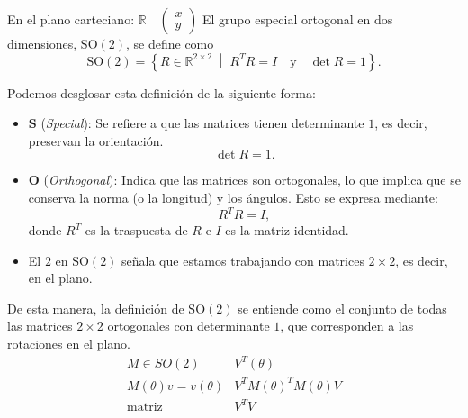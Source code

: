 \documentclass[a4paper,12pt]{article}
\begin{document}
En el plano carteciano: 
$\mathbb{R} \quad \begin{pmatrix}
    x\\y
\end{pmatrix} $
El grupo especial ortogonal en dos dimensiones, \(\mathrm{SO}(2)\), se define como
\[
\mathrm{SO}(2) = \left\{ R \in \mathbb{R}^{2\times2} \;\middle|\; R^T R = I \quad \text{y} \quad \det R = 1 \right\}.
\]
\vspace{1cm}

Podemos desglosar esta definición de la siguiente forma:

\begin{itemize}
  \item \(\mathbf{S}\) (\emph{Special}): Se refiere a que las matrices tienen determinante \(1\), es decir, preservan la orientación.  
    \[
    \det R = 1.
    \]
  \item \(\mathbf{O}\) (\emph{Orthogonal}): Indica que las matrices son ortogonales, lo que implica que se conserva la norma (o la longitud) y los ángulos. Esto se expresa mediante:
    \[
    R^T R = I,
    \]
    donde \(R^T\) es la traspuesta de \(R\) e \(I\) es la matriz identidad.
  \item El \(2\) en \(\mathrm{SO}(2)\) señala que estamos trabajando con matrices \(2 \times 2\), es decir, en el plano.
\end{itemize}

De esta manera, la definición de \(\mathrm{SO}(2)\) se entiende como el conjunto de todas las matrices \(2 \times 2\) ortogonales con determinante \(1\), que corresponden a las rotaciones en el plano.
\[
\begin{array}{c|c}
     M  \in SO(2) & V^T (\theta )  \\
     M (\theta )v = v(\theta ) & V^T M(\theta )^T M(\theta )V \\
     \text{matriz} & V^T V 
\end{array}
\]
\end{document}
